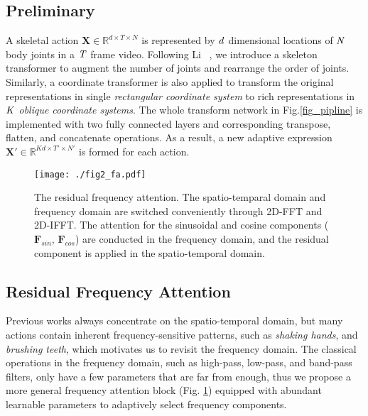 \documentclass{article}
\begin{document}
\subsection{Preliminary}
A skeletal action {\myfont$\bm{X} \in \mathbb{R}^{d \times T\times N}$} is represented by $ \it{d} $ dimensional locations of {\myfont$ \it{N} $} body joints in a {\myfont$ \it{T} $} frame video. Following Li \etal~\cite{DBLP:conf/icmcs/LiZXP17}, we introduce a skeleton transformer to augment the number of joints and rearrange the order of joints. Similarly, a coordinate transformer is also applied to transform the original representations in single \textit{rectangular coordinate system} to rich representations in {\myfont$ \it{K} $} \textit{oblique coordinate systems}. The whole transform network in Fig.\ref{fig_pipline} is implemented with two fully connected layers and corresponding transpose, flatten, and concatenate operations. As a result, a new adaptive expression {\myfont$\bm{X'} \in \mathbb{R}^{Kd \times T'\times N'}$} is formed for each action. 

\begin{figure}[htb]
	\centering
	\texttt{[image: ./fig2\_fa.pdf]}
	\caption{The residual frequency attention. The spatio-temparal domain and frequency domain are switched conveniently through 2D-FFT and 2D-IFFT. The attention for the sinusoidal and cosine components ($ \bm{F}_{sin} $, $ \bm{F}_{cos} $) are conducted in the frequency domain, and the residual component is applied in the spatio-temporal domain.}
	\label{fig2}
\end{figure}

\subsection{Residual Frequency Attention}
Previous works always concentrate on the spatio-temporal domain, but many actions contain inherent frequency-sensitive patterns, such as \textit{shaking hands}, and \textit{brushing teeth}, which motivates us to revisit the frequency domain. The classical operations in the frequency domain, such as high-pass, low-pass, and band-pass filters, only have a few parameters that are far from enough, thus we propose a more general frequency attention block (Fig. \ref{fig2}) equipped with abundant learnable parameters to adaptively select frequency components.
\end{document}
